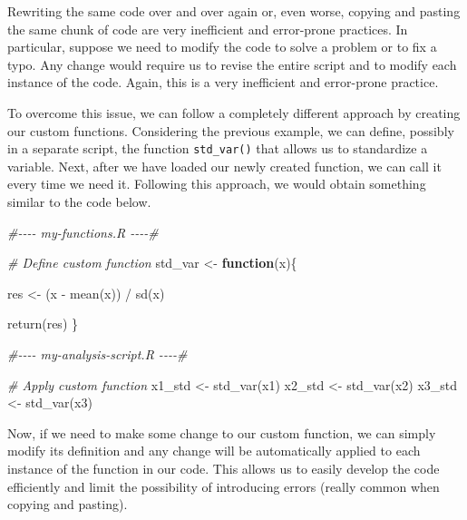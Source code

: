 \documentclass[
  11pt,
]{book}
\newenvironment{Shaded}{\begin{snugshade}}{\end{snugshade}}
\newcommand{\CommentTok}[1]{\textcolor[rgb]{0.56,0.35,0.01}{\textit{#1}}}
\newcommand{\ControlFlowTok}[1]{\textcolor[rgb]{0.13,0.29,0.53}{\textbf{#1}}}
\newcommand{\FunctionTok}[1]{\textcolor[rgb]{0.00,0.00,0.00}{#1}}
\newcommand{\NormalTok}[1]{#1}
\newcommand{\OtherTok}[1]{\textcolor[rgb]{0.56,0.35,0.01}{#1}}
\newcommand{\SpecialCharTok}[1]{\textcolor[rgb]{0.00,0.00,0.00}{#1}}
\newenvironment{code-tex-good}
  {\begingroup\definecolor{shadecolor}{RGB}{224, 240, 227}}
  {\endgroup}
\begin{document}
Rewriting the same code over and over again or, even worse, copying and pasting the same chunk of code are very inefficient and error-prone practices. In particular, suppose we need to modify the code to solve a problem or to fix a typo. Any change would require us to revise the entire script and to modify each instance of the code. Again, this is a very inefficient and error-prone practice.

To overcome this issue, we can follow a completely different approach by creating our custom functions. Considering the previous example, we can define, possibly in a separate script, the function \texttt{std\_var()} that allows us to standardize a variable. Next, after we have loaded our newly created function, we can call it every time we need it. Following this approach, we would obtain something similar to the code below.

\begin{code-tex-good}

\begin{Shaded}
\begin{Highlighting}[]
\CommentTok{\#{-}{-}{-}{-}    my{-}functions.R    {-}{-}{-}{-}\#}

\CommentTok{\# Define custom function}
\NormalTok{std\_var }\OtherTok{\textless{}{-}} \ControlFlowTok{function}\NormalTok{(x)\{}
  
\NormalTok{  res }\OtherTok{\textless{}{-}}\NormalTok{ (x }\SpecialCharTok{{-}} \FunctionTok{mean}\NormalTok{(x)) }\SpecialCharTok{/} \FunctionTok{sd}\NormalTok{(x)}
  
  \FunctionTok{return}\NormalTok{(res)}
\NormalTok{\}}

\CommentTok{\#{-}{-}{-}{-}    my{-}analysis{-}script.R    {-}{-}{-}{-}\#}

\CommentTok{\# Apply custom function}
\NormalTok{x1\_std }\OtherTok{\textless{}{-}} \FunctionTok{std\_var}\NormalTok{(x1)}
\NormalTok{x2\_std }\OtherTok{\textless{}{-}} \FunctionTok{std\_var}\NormalTok{(x2)}
\NormalTok{x3\_std }\OtherTok{\textless{}{-}} \FunctionTok{std\_var}\NormalTok{(x3)}
\end{Highlighting}
\end{Shaded}

\end{code-tex-good}

Now, if we need to make some change to our custom function, we can simply modify its definition and any change will be automatically applied to each instance of the function in our code. This allows us to easily develop the code efficiently and limit the possibility of introducing errors (really common when copying and pasting).
\end{document}
